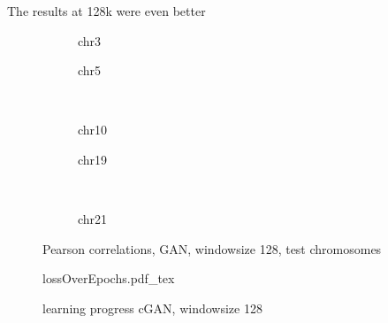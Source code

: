 The results at 128k were even better \xxx
\begin{figure}[p]
    \begin{subfigure}{0.45\textwidth}
        \scriptsize
        \caption{chr3}
    \end{subfigure} \hfill
    \begin{subfigure}{0.45\textwidth}
        \scriptsize
        \caption{chr5}
    \end{subfigure}\\[5mm]
    \begin{subfigure}{0.45\textwidth}
        \scriptsize
        \caption{chr10}
    \end{subfigure}\hfill
    \begin{subfigure}{0.45\textwidth}
        \scriptsize
        \caption{chr19}
    \end{subfigure}\\[3mm]
    \centering
    \begin{subfigure}{0.45\textwidth}
        \scriptsize
        \caption{chr21}
    \end{subfigure}
    \caption{Pearson correlations, GAN, windowsize 128, test chromosomes}
    \label{fig:results:GAN128_pearson}
\end{figure}
\begin{figure}[hbp]
 \centering
 \scriptsize
 {lossOverEpochs.pdf_tex}
 \caption{learning progress cGAN, windowsize 128} \label{fig:results:GAN128_lossEpochs}
\end{figure}




